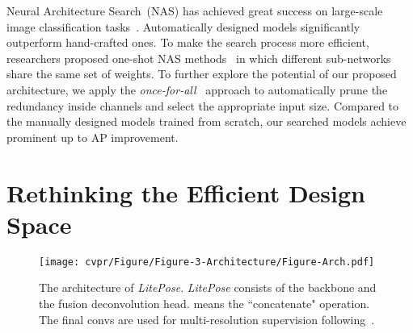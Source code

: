 \documentclass[10pt,twocolumn,letterpaper]{article}
\begin{document}

Neural Architecture Search~(NAS) has achieved great success on large-scale image classification tasks~\cite{liu2017hierarchical,liu2018progressive,zoph2016neural,cai2018efficient}. Automatically designed models significantly outperform hand-crafted ones. To make the search process more efficient, researchers proposed one-shot NAS methods~\cite{liu2018darts,cai2018proxylessnas,wu2019fbnet,howard2019searching,guo2020single,bender2018understanding,cai2019once} in which different sub-networks share the same set of weights. To further explore the potential of our proposed architecture, we apply the \textit{once-for-all}~\cite{cai2019once} approach to automatically prune the redundancy inside channels and select the appropriate input size. Compared to the manually designed models trained from scratch, our searched models achieve prominent up to AP improvement.

 \section{Rethinking the Efficient Design Space}

\begin{figure*}[t]
\centering
	\texttt{[image: cvpr/Figure/Figure-3-Architecture/Figure-Arch.pdf]}
\caption{The architecture of \textit{LitePose}. \textit{LitePose} consists of the backbone and the fusion deconvolution head.  means the ``concatenate" operation. The final convs are used for multi-resolution supervision following~\cite{cheng2020higherhrnet}.}
\label{fig:4-arch}
\end{figure*}
 
\end{document}
